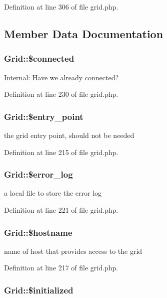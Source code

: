 Definition at line 306 of file grid.php.

\subsection{Member Data Documentation}
\subsubsection{\setlength{\rightskip}{0pt plus 5cm}Grid::\$connected}\label{classGrid_o10}


Internal: Have we already connected? 



Definition at line 230 of file grid.php.
\subsubsection{\setlength{\rightskip}{0pt plus 5cm}Grid::\$entry\_\-point}\label{classGrid_o0}


the grid entry point, should not be needed 



Definition at line 215 of file grid.php.
\subsubsection{\setlength{\rightskip}{0pt plus 5cm}Grid::\$error\_\-log}\label{classGrid_o6}


a local file to store the error log 



Definition at line 221 of file grid.php.
\subsubsection{\setlength{\rightskip}{0pt plus 5cm}Grid::\$hostname}\label{classGrid_o2}


name of host that provides access to the grid 



Definition at line 217 of file grid.php.
\subsubsection{\setlength{\rightskip}{0pt plus 5cm}Grid::\$initialized}\label{classGrid_o11}


